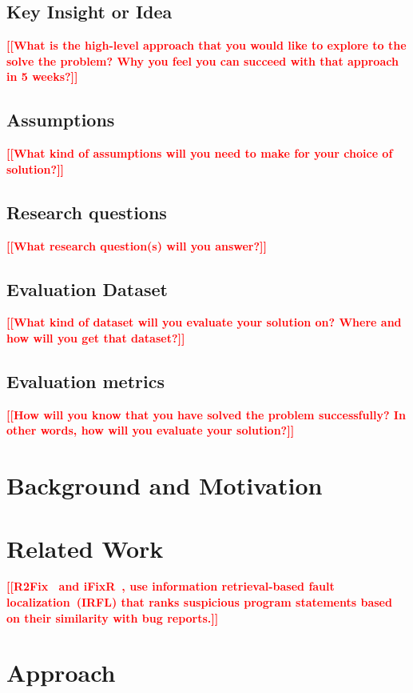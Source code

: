\documentclass[conference]{IEEEtran}
\newcommand{\todo}[1]{\textcolor{red}{{\bfseries [[#1]]}}}
\begin{document}
\subsection{Key Insight or Idea}
    \todo{What is the high-level approach that you would like to explore to the solve the problem? Why you feel you can succeed with that approach in 5 weeks?}

\subsection{Assumptions}
    \todo{What kind of assumptions will you need to make for your choice of solution?}

\subsection{Research questions}
    \todo{What research question(s) will you answer?}

\subsection{Evaluation Dataset}
    \todo{What kind of dataset will you evaluate your solution on? Where and how will you get that dataset?}

\subsection{Evaluation metrics}
    \todo{How will you know that you have solved the problem successfully? In other words, how will you evaluate your solution?}


\section{Background and Motivation}
\label{sec:background-and-motivation}

\section{Related Work}
\label{sec:relatedwork}
\todo{R2Fix~\cite{Liu13} and iFixR~\cite{Koyuncu19}, use information retrieval-based fault localization~(IRFL)
that ranks suspicious program statements based on their similarity with bug reports.}

\section{Approach}
\label{sec:approach}
\end{document}
